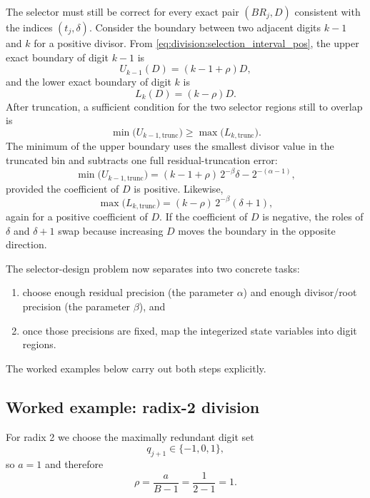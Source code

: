 \documentclass[11pt]{article}
\numberwithin{equation}{section}
\begin{document}
The selector must still be correct for every exact pair $(BR_j,D)$ consistent with the indices
$(t_j,\delta)$.
Consider the boundary between two adjacent digits $k-1$ and $k$ for a positive divisor.
From \cref{eq:division:selection_interval_pos}, the upper exact boundary of digit $k-1$ is
\[
  U_{k-1}(D) = (k-1+\rho)D,
\]
and the lower exact boundary of digit $k$ is
\[
  L_k(D) = (k-\rho)D.
\]
After truncation, a sufficient condition for the two selector regions still to overlap is
\begin{equation}
  \label{eq:division:continuity_condition}
  \min\bigl(U_{k-1,\text{trunc}}\bigr) \ge \max\bigl(L_{k,\text{trunc}}\bigr).
\end{equation}
The minimum of the upper boundary uses the smallest divisor value in the truncated bin and subtracts
one full residual-truncation error:
\begin{equation}
  \label{eq:division:continuity_upper_generic}
  \min\bigl(U_{k-1,\text{trunc}}\bigr) = (k-1+\rho)\,2^{-\beta}\delta - 2^{-(\alpha-1)},
\end{equation}
provided the coefficient of $D$ is positive.
Likewise,
\begin{equation}
  \label{eq:division:continuity_lower_generic}
  \max\bigl(L_{k,\text{trunc}}\bigr) = (k-\rho)\,2^{-\beta}(\delta+1),
\end{equation}
again for a positive coefficient of $D$.
If the coefficient of $D$ is negative, the roles of $\delta$ and $\delta+1$ swap because increasing
$D$ moves the boundary in the opposite direction.

The selector-design problem now separates into two concrete tasks:
\begin{enumerate}
  \item choose enough residual precision (the parameter $\alpha$) and enough divisor/root precision
        (the parameter $\beta$), and
  \item once those precisions are fixed, map the integerized state variables into digit regions.
\end{enumerate}
The worked examples below carry out both steps explicitly.

\subsection{Worked example: radix-2 division}
\label{ssec:division:radix2}

For radix 2 we choose the maximally redundant digit set
\[
  q_{j+1} \in \{-1,0,1\},
\]
so $a=1$ and therefore
\begin{equation}
  \label{eq:division:radix2_rho}
  \rho = \frac{a}{B-1} = \frac{1}{2-1} = 1.
\end{equation}
\end{document}
